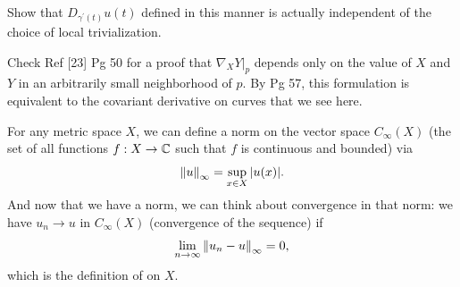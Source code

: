\documentclass[10pt]{article}
\begin{document}
\begin{example}\label{b2e88}
	Show that $D_{\gamma^\prime(t)}u(t)$ defined in this manner is actually independent of the choice of local trivialization.
\end{example}
\sol Check Ref [23] Pg 50 for a proof that $\nabla_XY|_p$ depends only on the value of $X$ and $Y$ in an arbitrarily small neighborhood of $p$. By Pg 57, this formulation is equivalent to the covariant derivative on curves that we see here.


\begin{definition}
	For any metric space $X$, we can define a norm on the vector space $C_\infty(X)$ (the set of all functions $f:X\to\mathbb{C}$ such that $f$ is continuous and bounded) via
	$$
	\norm{u}_\infty=\sup_{x\in X} \abs{u(x)}.
	$$
	And now that we have a norm, we can think about convergence in that norm: we have $u_n \to u$ in $C_\infty(X)$ (convergence of the sequence) if
	$$
	\lim_{n\to\infty} \norm{u_n-u}_\infty=0,
	$$
	which is the definition of  on $X$.
\end{definition}
\end{document}
